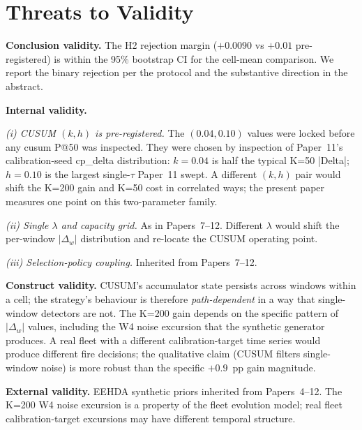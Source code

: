 \section{Threats to Validity}
\label{sec:threats}

\textbf{Conclusion validity.} The H2 rejection margin ($+0.0090$
vs $+0.01$ pre-registered) is within the 95\% bootstrap CI for the
cell-mean comparison. We report the binary rejection per the
protocol and the substantive direction in the abstract.

\textbf{Internal validity.}

\textit{(i) CUSUM $(k, h)$ is pre-registered.} The $(0.04, 0.10)$
values were locked before any cusum P@50 was inspected. They were
chosen by inspection of Paper~11's calibration-seed cp\_delta
distribution: $k = 0.04$ is half the typical K=50 |Delta|; $h =
0.10$ is the largest single-$\tau$ Paper~11 swept. A different
$(k, h)$ pair would shift the K=200 gain and K=50 cost in
correlated ways; the present paper measures one point on this
two-parameter family.

\textit{(ii) Single $\lambda$ and capacity grid.} As in
Papers~7--12. Different $\lambda$ would shift the per-window
$|\Delta_w|$ distribution and re-locate the CUSUM operating point.

\textit{(iii) Selection-policy coupling.} Inherited from Papers~7--12.

\textbf{Construct validity.} CUSUM's accumulator state persists
across windows within a cell; the strategy's behaviour is therefore
\textit{path-dependent} in a way that single-window detectors are
not. The K=200 gain depends on the specific pattern of
$|\Delta_w|$ values, including the W4 noise excursion that the
synthetic generator produces. A real fleet with a different
calibration-target time series would produce different fire
decisions; the qualitative claim (CUSUM filters single-window noise)
is more robust than the specific $+0.9$~pp gain magnitude.

\textbf{External validity.} EEHDA synthetic priors inherited from
Papers~4--12. The K=200 W4 noise excursion is a property of the
fleet evolution model; real fleet calibration-target excursions
may have different temporal structure.
